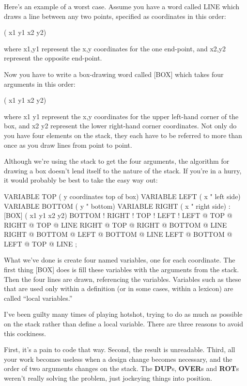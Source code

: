 Here's an example of a worst case. Assume you have a word called
LINE which draws a line between any two points, specified as coordinates
in this order:

\begin{Code}
( x1 y1 x2 y2)
\end{Code}
where x1,y1 represent the x,y coordinates for the one end-point, and
x2,y2 represent the opposite end-point.

Now you have to write a box-drawing word called [BOX] which
takes four arguments in this order:

\begin{Code}
( x1 y1 x2 y2)
\end{Code}
where x1 y1 represent the x,y coordinates for the upper left-hand corner
of the box, and x2 y2 represent the lower right-hand corner coordinates.
Not only do you have four elements on the stack, they each have to
be referred to more than once as you draw lines from point to point.

Although we're using the stack to get the four arguments, the algorithm
for drawing a box doesn't lend itself to the nature of the stack. If you're
in a hurry, it would probably be best to take the easy way out:

\begin{Code}
VARIABLE TOP         ( y coordinates top of box)
VARIABLE LEFT        ( x     "       left side)
VARIABLE BOTTOM      ( y     "       bottom)
VARIABLE RIGHT       ( x     "       right side)
: [BOX]   ( x1 y1 x2 y2)   BOTTOM !  RIGHT !  TOP !  LEFT !
   LEFT @ TOP @  RIGHT @ TOP @  LINE
   RIGHT @ TOP @  RIGHT @ BOTTOM @  LINE
   RIGHT @ BOTTOM @  LEFT @ BOTTOM @  LINE
   LEFT @ BOTTOM @  LEFT @ TOP @  LINE ;
\end{Code}
What we've done is create four named variables, one for each coordinate.
The first thing [BOX] does is fill these variables with the arguments from
the stack. Then the four lines are drawn, referencing the variables.
Variables such as these that are used only within a definition (or in some
cases, within a lexicon) are called ``local variables.''

I've been guilty many times of playing hotshot, trying to do as
much as possible on the stack rather than define a local variable. There
are three reasons to avoid this cockiness.

First, it's a pain to code that way. Second, the result is unreadable.
Third, all your work becomes useless when a design change becomes
necessary, and the order of two arguments changes on the stack. The
\textbf{DUP}s, \textbf{OVER}s and \textbf{ROT}s weren't really solving the problem,
just jockeying things into position.

